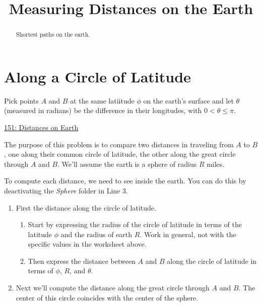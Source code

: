 \documentclass{ximera}
\title{Measuring Distances on the Earth}
\begin{document}
\begin{abstract}
Shortest paths on the earth.
\end{abstract}
\maketitle


\section{Along a Circle of Latitude}

\begin{question} \label{Q34dgbnhhtrg}

Pick points $A$ and $B$ at the same latiitude $\phi$ on the earth's surface and let $\theta$ (measured in radians) be the difference in their longitudes, with $0<\theta \leq \pi$.

\begin{onlineOnly}
   \begin{center}
\end{center}
\end{onlineOnly}

\href{https://www.desmos.com/3d/ajoeay29il}{151: Distances on Earth}

The purpose of this problem is to compare two distances in traveling from $A$ to $B$, one along their common circle of latitude, the other along the great circle through $A$ and $B$. We'll assume the earth is a sphere of radius $R$ miles.

To compute each distance, we need to see inside the earth. You can do this by deactivating the \emph{Sphere} folder in Line 3.

\begin{enumerate}
\item First the distance along the circle of latitude.

\begin{enumerate}
\item Start by expressing the radius of the circle of latitude in terms of the latitude $\phi$ and the radius of earth $R$. Work in general, not with the specific values in the worksheet above.

\item Then express the distance between $A$ and $B$ along the circle of latitude in terms of $\phi$, $R$, and $\theta$.
\end{enumerate}

\item Next we'll compute the distance along the great circle through $A$ and $B$. The center of this circle coincides with the center of the sphere.


\end{enumerate}
\end{question}
\end{document}
